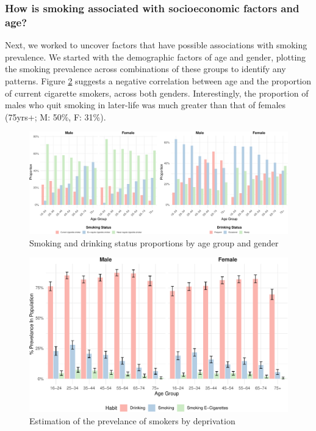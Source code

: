 \documentclass[
  11pt,
  twocolumn]{article}
\begin{document}
\subsubsection{How is smoking associated with socioeconomic factors and
age?}\label{how-is-smoking-associated-with-socioeconomic-factors-and-age}

Next, we worked to uncover factors that have possible associations with
smoking prevalence. We started with the demographic factors of age and
gender, plotting the smoking prevalence across combinations of these
groups to identify any patterns. Figure \ref{fig:output-prevelance-plot}
suggests a negative correlation between age and the proportion of
current cigarette smokers, across both genders. Interestingly, the
proportion of males who quit smoking in later-life was much greater than
that of females (75yrs+; M: 50\%, F: 31\%).

\begin{figure}[H]
\includegraphics{Coursework_files/figure-latex/output-smoking-drinking-age-plot-1} \caption{Smoking and drinking status proportions by age group and gender}\label{fig:output-smoking-drinking-age-plot}
\end{figure}

\begin{figure}[H]
\includegraphics{Coursework_files/figure-latex/output-prevelance-plot-1} \caption{Estimation of the prevelance of smokers by deprivation}\label{fig:output-prevelance-plot}
\end{figure}
\end{document}
